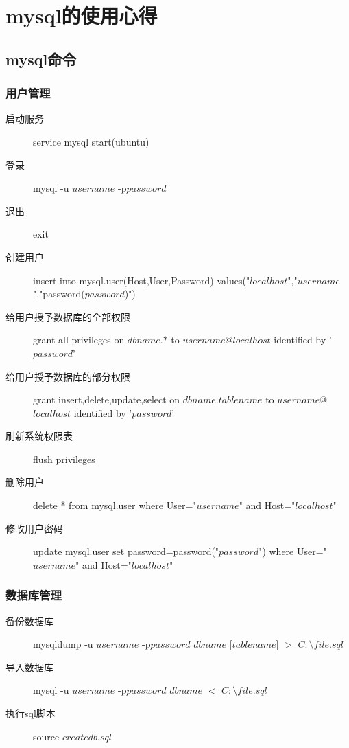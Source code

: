 \section{mysql的使用心得}
\subsection{mysql命令}
\subsubsection{用户管理}
\begin{description}
\item[启动服务]	service mysql start(ubuntu) 
\item[登录]	mysql -u $username$ -p$password$
\item[退出]	exit	
\item[创建用户]	insert into mysql.user(Host,User,Password) values("$localhost$","$username$","password($password$)")
\item[给用户授予数据库的全部权限]	grant all privileges on $dbname$.$*$ to $username$@$localhost$ identified by '$password$' 
\item[给用户授予数据库的部分权限]	grant insert,delete,update,select on $dbname$.$tablename$ to $username$@$localhost$ identified by '$password$' 
\item[刷新系统权限表]	flush privileges
\item[删除用户]	delete * from mysql.user where User="$username$" and Host="$localhost$"
\item[修改用户密码]	update mysql.user set password=password("$password$") where User="$username$" and Host="$localhost$"
\end{description}


\subsubsection{数据库管理}
\begin{description}
\item[备份数据库]		mysqldump -u $username$ -p$password$ $dbname$ [$tablename$] $>$ $C:\setminus{}file.sql$
\item[导入数据库]		mysql -u $username$ -p$password$ $dbname$ $<$ $C:\setminus{}file.sql$
\item[执行sql脚本]	source $createdb.sql$
\end{description}


